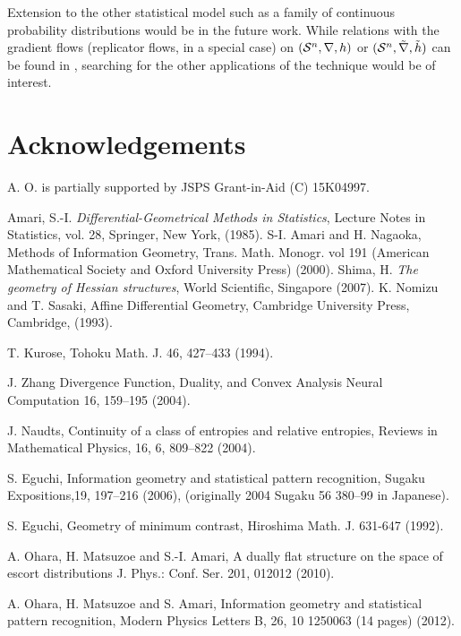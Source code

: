 \documentclass{llncs}
\begin{document}
Extension to the other statistical model such as a family of continuous 
probability distributions would be in the future work.
While relations with the gradient flows (replicator flows, in a special case) 
on $({\cal S}^n,\nabla,h)$ or $({\cal S}^n,\tilde \nabla, \tilde h)$ 
can be found in \cite{Ohara18}, searching for the other applications 
of the technique would be of interest.




%
%
\section*{Acknowledgements}
A. O. is partially supported by JSPS Grant-in-Aid (C) 15K04997.

\begin{thebibliography}{5}
%
	Amari, S.-I.
	{\it Differential-Geometrical Methods in Statistics}, 
	Lecture Notes in Statistics, vol. 28, Springer, New York, (1985).
S-I. Amari and H. Nagaoka,
Methods of Information Geometry,
Trans. Math. Monogr. vol 191
(American Mathematical Society and Oxford University Press) (2000).
	Shima, H.
	{\em The geometry of Hessian structures},
	World Scientific, Singapore (2007).
K. Nomizu and T. Sasaki,
Affine Differential Geometry, Cambridge University Press,
Cambridge, (1993).

T. Kurose, Tohoku Math. J. 46, 427--433 (1994).

J. Zhang
Divergence Function, Duality, and Convex Analysis
Neural Computation 16, 159--195 (2004).

J. Naudts, 
Continuity of a class of entropies and relative entropies,
Reviews in Mathematical Physics, 16, 6, 809--822 (2004).

S. Eguchi,
Information geometry and statistical pattern recognition,
Sugaku Expositions,19, 197--216 (2006),
(originally 2004 Sugaku 56 380--99 in Japanese).

S. Eguchi,
Geometry of minimum contrast,
Hiroshima Math. J. 631-647 (1992).

A. Ohara, H. Matsuzoe and S.-I. Amari, 
A dually flat structure on the space of escort distributions
J. Phys.: Conf. Ser. 201, 012012 (2010).

A. Ohara, H. Matsuzoe and S. Amari,
Information geometry and statistical pattern recognition,
Modern Physics Letters B, 26, 10 1250063 (14 pages) (2012).


\end{thebibliography}
\end{document}
